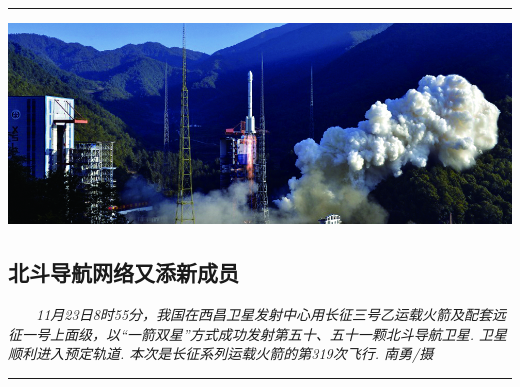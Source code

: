 \vfill
\noindent\rule{\linewidth}{0.5pt}
\noindent\begin{minipage}[b]{0.69\linewidth}\includegraphics[width=\linewidth]{IMG/201911/005SySbsly1g97w7lpy7nj33sw2j4e82.jpg}\end{minipage}\hfill
\begin{minipage}[b]{0.29\linewidth}
\subsection*{北斗导航网络又添新成员}
\emph{　　\emph{11}月\emph{23}日\emph{8}时\emph{55}分，我国在西昌卫星发射中心用长征三号乙运载火箭及配套远征一号上面级，以“一箭双星”方式成功发射第五十、五十一颗北斗导航卫星. 卫星顺利进入预定轨道. 本次是长征系列运载火箭的第\emph{319}次飞行. \hfill 南勇\emph{/}摄}
\end{minipage}\vskip-0.25cm
\noindent\rule{\linewidth}{0.5pt}


